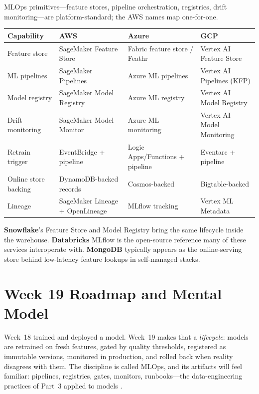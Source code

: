 \begin{crosscloud}
MLOps primitives---feature stores, pipeline orchestration, registries, drift monitoring---are platform-standard; the AWS names map one-for-one.

\vspace{2mm}
{\footnotesize
\begin{tabular}{@{}p{2.8cm}p{3.0cm}p{3.0cm}p{3.0cm}@{}}
\toprule
\textbf{Capability} & \textbf{AWS} & \textbf{Azure} & \textbf{GCP} \\
\midrule
Feature store & SageMaker Feature Store & Fabric feature store / Feathr & Vertex AI Feature Store \\
ML pipelines & SageMaker Pipelines & Azure ML pipelines & Vertex AI Pipelines (KFP) \\
Model registry & SageMaker Model Registry & Azure ML registry & Vertex AI Model Registry \\
Drift monitoring & SageMaker Model Monitor & Azure ML monitoring & Vertex AI Model Monitoring \\
Retrain trigger & EventBridge + pipeline & Logic Apps/Functions + pipeline & Eventarc + pipeline \\
\addlinespace
Online store backing & DynamoDB-backed records & Cosmos-backed & Bigtable-backed \\
Lineage & SageMaker Lineage + OpenLineage & MLflow tracking & Vertex ML Metadata \\
\bottomrule
\end{tabular}}

\vspace{1mm}
\textbf{Snowflake}'s Feature Store and Model Registry bring the same lifecycle inside the warehouse. \textbf{Databricks} MLflow is the open-source reference many of these services interoperate with. \textbf{MongoDB} typically appears as the online-serving store behind low-latency feature lookups in self-managed stacks.
\end{crosscloud}

\section{Week 19 Roadmap and Mental Model}
Week~18 trained and deployed a model. Week~19 makes that a \emph{lifecycle}: models are retrained on fresh features, gated by quality thresholds, registered as immutable versions, monitored in production, and rolled back when reality disagrees with them. The discipline is called MLOps, and its artifacts will feel familiar: pipelines, registries, gates, monitors, runbooks---the data-engineering practices of Part~3 applied to models \cite{awsSageMakerPipelinesDocs}.

